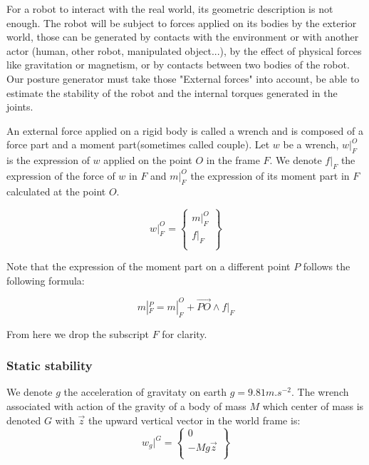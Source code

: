 For a robot to interact with the real world, its geometric description is not enough.
The robot will be subject to forces applied on its bodies by the exterior world, those can be generated by contacts with the environment or with another actor (human, other robot, manipulated object...), by the effect of physical forces like gravitation or magnetism, or by contacts between two bodies of the robot.
Our posture generator must take those "External forces" into account, be able to estimate the stability of the robot and the internal torques generated in the joints.

An external force applied on a rigid body is called a wrench and is composed of a force part and a moment part(sometimes called couple).
Let $w$ be a wrench, $w|_F^O$ is the expression of $w$ applied on the point $O$ in the frame $F$.
We denote $f|_F$ the expression of the force of $w$ in $F$ and $m|_F^O$ the expression of its moment part in $F$ calculated at the point $O$.

\begin{equation}
  w|_F^O = \left\{ \begin{array}{r}
    m|_F^O\\
    f|_F\\
  \end{array} \right\}
\end{equation}

Note that the expression of the moment part on a different point $P$ follows the following formula:

\begin{equation}
  m|_F^P = m|_F^O + \overrightarrow{PO} \wedge f|_F
\end{equation}

From here we drop the subscript $F$ for clarity.

\subsubsection{Static stability}
\label{subsub:static_stability}

We denote $g$ the acceleration of gravitaty on earth $g = 9.81 m.s^{-2}$.
The wrench associated with action of the gravity of a body of mass $M$ which center of mass is denoted $G$ with $\vec{z}$ the upward vertical vector in the world frame is:
\begin{equation}
  w_g|^G = \left\{ \begin{array}{r}
     0 \\
     -Mg\vec{z} \\
  \end{array}\right\}
\end{equation}

